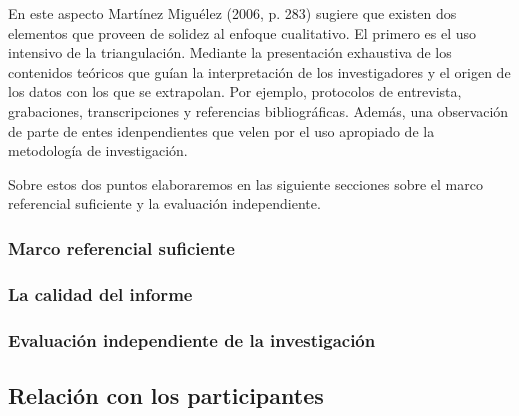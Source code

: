 En este aspecto Martínez Miguélez (2006, p. 283) sugiere que existen dos
elementos que proveen de solidez al enfoque cualitativo.
El primero es el uso intensivo de la triangulación.
Mediante la presentación exhaustiva de los contenidos teóricos que guían la
interpretación de los investigadores y el origen de los datos con los que se
extrapolan.
Por ejemplo, protocolos de entrevista, grabaciones, transcripciones y
referencias bibliográficas.
Además, una observación de parte de entes idenpendientes que velen por el uso
apropiado de la metodología de investigación.

Sobre estos dos puntos elaboraremos en las siguiente secciones sobre el marco
referencial suficiente y la evaluación independiente.

    \subsubsection{Marco referencial suficiente}

    \subsubsection{La calidad del informe}

    \subsubsection{Evaluación independiente de la investigación}

\subsection{Relación con los participantes}
